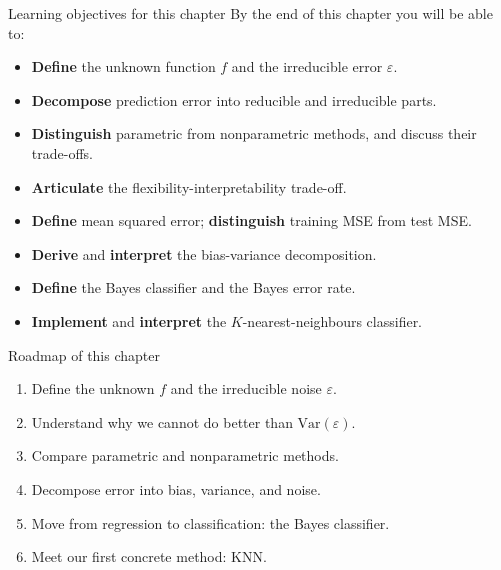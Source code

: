 \documentclass[aspectratio=169,11pt]{beamer}
\begin{document}
\begin{frame}{Learning objectives for this chapter}
  By the end of this chapter you will be able to:
  \begin{itemize}
    \item \textbf{Define} the unknown function $f$ and the
          irreducible error $\varepsilon$.
    \item \textbf{Decompose} prediction error into reducible and
          irreducible parts.
    \item \textbf{Distinguish} parametric from nonparametric methods,
          and discuss their trade-offs.
    \item \textbf{Articulate} the flexibility-interpretability
          trade-off.
    \item \textbf{Define} mean squared error; \textbf{distinguish}
          training MSE from test MSE.
    \item \textbf{Derive} and \textbf{interpret} the bias-variance
          decomposition.
    \item \textbf{Define} the Bayes classifier and the Bayes error
          rate.
    \item \textbf{Implement} and \textbf{interpret} the
          $K$-nearest-neighbours classifier.
  \end{itemize}
\end{frame}


\begin{frame}{Roadmap of this chapter}
  \begin{takeaway}
    \begin{enumerate}
      \item Define the unknown $f$ and the irreducible noise $\varepsilon$.
      \item Understand why we cannot do better than $\mathrm{Var}(\varepsilon)$.
      \item Compare parametric and nonparametric methods.
      \item Decompose error into bias, variance, and noise.
      \item Move from regression to classification: the Bayes classifier.
      \item Meet our first concrete method: KNN.
    \end{enumerate}
  \end{takeaway}
\end{frame}
\end{document}
